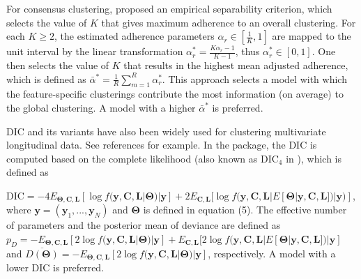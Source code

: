 For consensus clustering, \citet{Lock2013} proposed an empirical separability criterion, which selects the value of $K$ that gives maximum adherence to an overall clustering. For each $K \ge 2$, the estimated adherence parameters $\alpha_r \in [\frac{1}{K},1]$ are mapped to the unit interval by the linear transformation  $\alpha^{*}_r = \frac{K\alpha_r - 1}{K-1}$, thus $\alpha^{*}_r \in [0,1]$. One then selects the value of $K$ that results in the highest mean adjusted adherence, which is defined as $ \bar{\alpha}^{*} = \frac{1}{R}\sum_{m=1}^R \alpha^{*}_r$.  This approach selects a model with which the feature-specific clusterings contribute the most information (on average) to the global clustering. A model with a higher $\bar{\alpha}^{*}$ is preferred.

DIC and its variants have also been widely used for clustering multivariate longitudinal data. See references \citep{Lu2019, Neelon2011, Leiby2009,Elliott2005,Fruehwirth-Schnatter2010} for example. In the  package, the DIC is computed based on the complete likelihood (also known as $\text{DIC}_4$ in \citet{Celeux2006}), which is defined as

$ \text{DIC} = -4E_{\boldsymbol{\Theta},\boldsymbol{C},\boldsymbol{L}} [\log f(\boldsymbol{y},\boldsymbol{C},\boldsymbol{L}|\boldsymbol{\Theta})|\boldsymbol{y}]+ 2E_{\boldsymbol{C},\boldsymbol{L}}[\log f(\boldsymbol{y},\boldsymbol{C},\boldsymbol{L}|E[\boldsymbol{\Theta}|\boldsymbol{y},\boldsymbol{C},\boldsymbol{L}])|\boldsymbol{y})]$, where $\boldsymbol{y} = (\boldsymbol{y}_1, ..., \boldsymbol{y}_N)$ and $\boldsymbol{\Theta}$ is defined in equation (5). The effective number of parameters and the posterior mean of deviance are defined as $p_D = - E_{\boldsymbol{\Theta},\boldsymbol{C},\boldsymbol{L}}[2\log f(\boldsymbol{y},\boldsymbol{C},\boldsymbol{L}|\boldsymbol{\Theta})|\boldsymbol{y}] +  E_{\boldsymbol{C},\boldsymbol{L}}[2\log f(\boldsymbol{y},\boldsymbol{C},\boldsymbol{L}|E[\boldsymbol{\Theta}|\boldsymbol{y},\boldsymbol{C},\boldsymbol{L}])|\boldsymbol{y}]$ and $\overline{D(\boldsymbol{\Theta})} = -E_{\boldsymbol{\Theta},\boldsymbol{C},\boldsymbol{L}}[2\log f(\boldsymbol{y},\boldsymbol{C},\boldsymbol{L}|\boldsymbol{\Theta})|\boldsymbol{y}]$, respectively. A model with a lower DIC is preferred. 

